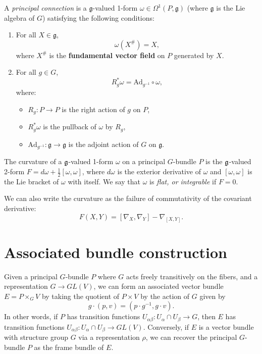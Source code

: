\documentclass[12pt]{article}
\begin{document}
\begin{definition}
	A \emph{principal connection} is a \(\mathfrak{g}\)-valued 1-form \(\omega \in \Omega^1(P, \mathfrak{g})\) (where \(\mathfrak{g}\) is the Lie algebra of \(G\)) satisfying the following conditions:

	\begin{enumerate}
		\item For all \(X \in \mathfrak{g}\),
		      \[
			      \omega(X^\#) = X,
		      \]
		      where \(X^\#\) is the \textbf{fundamental vector field} on \(P\) generated by \(X\).


		\item For all \(g \in G\),
		      \[
			      R_g^* \omega = \text{Ad}_{g^{-1}} \circ \omega,
		      \]
		      where:
		      \begin{itemize}
			      \item \(R_g: P \to P\) is the right action of \(g\) on \(P\),
			      \item \(R_g^* \omega\) is the pullback of \(\omega\) by \(R_g\),
			      \item \(\text{Ad}_{g^{-1}}: \mathfrak{g} \to \mathfrak{g}\) is the adjoint action of \(G\) on \(\mathfrak{g}\).
		      \end{itemize}
	\end{enumerate}
\end{definition}

\begin{definition}
    The curvature of a $\mathfrak{g}$-valued 1-form $\omega$ on a principal $G$-bundle $P$ is the $\mathfrak{g}$-valued 2-form $F = d\omega + \frac{1}{2}[\omega, \omega]$, where $d\omega$ is the exterior derivative of $\omega$ and $[\omega, \omega]$ is the Lie bracket of $\omega$ with itself. We say that $\omega$ is \emph{flat, or integrable} if $F = 0$.
\end{definition}

\begin{remark}
    We can also write the curvature as the failure of commutativity of the covariant derivative:
    \[
        F(X, Y) = [\nabla_X, \nabla_Y] - \nabla_{[X, Y]}.
    \]
\end{remark}



\section{Associated bundle construction}
Given a principal $G$-bundle $P$ where $G$ acts freely transitively on the fibers, and a representation 
$G\to GL(V)$, we can form an associated vector bundle $E = P\times_G V$ by taking the quotient of $P\times V$ by the action of $G$ given by 
\[
g\cdot (p,v) = (p\cdot g^{-1}, g\cdot v).
\]
In other words, if $P$ has transition functions $U_{\alpha\beta} : U_\alpha\cap U_\beta \to G$, then $E$ has transition functions $U_{\alpha\beta} : U_\alpha\cap U_\beta \to GL(V)$. Conversely, if $E$ is a vector bundle with structure group $G$ via a representation $\rho$, we can recover the principal $G$-bundle $P$ as the frame bundle of $E$. 
\end{document}
